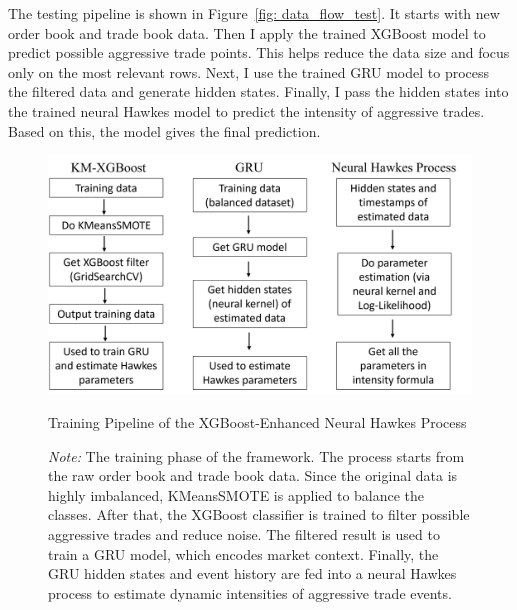 The testing pipeline is shown in Figure~\ref{fig: data_flow_test}. It starts with new order book and trade book data. Then I apply the trained XGBoost model to predict possible aggressive trade points. This helps reduce the data size and focus only on the most relevant rows. Next, I use the trained GRU model to process the filtered data and generate hidden states. Finally, I pass the hidden states into the trained neural Hawkes model to predict the intensity of aggressive trades. Based on this, the model gives the final prediction.



\begin{figure}[h]
    \centering
    \includegraphics[width=0.9\linewidth]{figures/data_flow_train.png}
    \caption{Training Pipeline of the XGBoost-Enhanced Neural Hawkes Process}
    \caption*{\textit{Note:} The training phase of the framework. The process starts from the raw order book and trade book data. Since the original data is highly imbalanced, KMeansSMOTE is applied to balance the classes. After that, the XGBoost classifier is trained to filter possible aggressive trades and reduce noise. The filtered result is used to train a GRU model, which encodes market context. Finally, the GRU hidden states and event history are fed into a neural Hawkes process to estimate dynamic intensities of aggressive trade events.}
    \label{fig: data_flow_train}
\end{figure}

